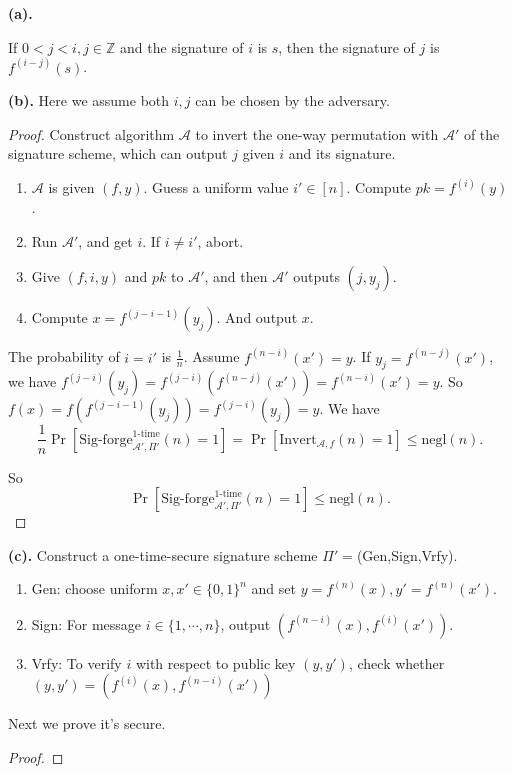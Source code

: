 \documentclass[a4paper]{article}
\newcommand{\negl}{\text{negl}}
\newcommand{\otime}{\text{1-time}}
\newcommand{\Invert}{\text{Invert}}
\newcommand{\Z}{\mathbb{Z}}
\newcommand{\A}{\mathcal{A}}
\newenvironment{problem}[2][Problem]{\begin{trivlist}
\item[\hskip \labelsep {\bfseries #1}\hskip \labelsep {\bfseries #2.}]}{\end{trivlist}}
\begin{document}
\begin{problem}{12.8} $ $\par
\textbf{(a).}\par
If $0<j<i,j\in\Z$ and the signature of $i$ is $s$, then the signature of $j$ is $f^{(i-j)}(s)$.\par\vspace{1ex}
\textbf{(b).} Here we assume both $i,j$ can be chosen by the adversary.\par
\begin{proof}
Construct algorithm $\A$ to invert the one-way permutation with $\A'$ of the signature scheme, which can output $j$ given $i$ and its signature.\par
\begin{enumerate}
    \item $\A$ is given $(f,y)$. Guess a uniform value $i'\in[n]$. Compute $pk=f^{(i)}(y)$.
    \item Run $\A'$, and get $i$. If $i\ne i'$, abort.
    \item Give $(f,i,y)$ and $pk$ to $\A'$, and then $\A'$ outputs $(j,y_j)$.
    \item Compute $x=f^{(j-i-1)}(y_j)$. And output $x$.
\end{enumerate}\par
The probability of $i=i'$ is $\frac1n$. Assume $f^{(n-i)}(x')=y$. If $y_j=f^{(n-j)}(x')$, we have $f^{(j-i)}(y_j)=f^{(j-i)}(f^{(n-j)}(x'))=f^{(n-i)}(x')=y$. So $f(x)=f(f^{(j-i-1)}(y_j))=f^{(j-i)}(y_j)=y$. We have
$$\frac1n\Pr[\text{Sig-forge}_{\A',\Pi'}^{\otime}(n)=1]=\Pr[\Invert_{\A,f}(n)=1]\le\negl(n).$$\par
So $$\Pr[\text{Sig-forge}_{\A',\Pi'}^{\otime}(n)=1]\le \negl(n).$$
\end{proof}\vspace{1ex}
\textbf{(c).} 
Construct a one-time-secure signature scheme $\Pi'=$(Gen,Sign,Vrfy).
\begin{enumerate}
    \item Gen: choose uniform $x,x'\in\{0,1\}^n$ and set $y=f^{(n)}(x),y'=f^{(n)}(x')$.
    \item Sign: For message $i\in\{1,\cdots,n\}$, output $(f^{(n-i)}(x),f^{(i)}(x'))$.
    \item Vrfy: To verify $i$ with respect to public key $(y,y')$, check whether $(y,y')=(f^{(i)}(x),f^{(n-i)}(x'))$
\end{enumerate}\par
Next we prove it's secure.\par
\begin{proof}

\end{proof}
\end{problem}
\end{document}
